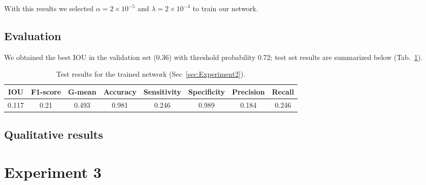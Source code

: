 With this results we selected $\alpha = 2 \times 10^{-5}$ and $\lambda = 2 \times 10^{-3}$ to train our network.

\subsection{Evaluation}
We obtained the best IOU in the validation set (0.36) with threshold probability 0.72; test set results are summarized below (Tab.~\ref{tab:Results2}).
\begin{table}[h]
	\centering
	\begin{tabular}{cccccccc}
	\hline
	\textbf{IOU}	& \textbf{F1-score}	& \textbf{G-mean} &\textbf{Accuracy}	& \textbf{Sensitivity} & \textbf{Specificity} & \textbf{Precision} & \textbf{Recall}\\
	\hline
	 0.117 & 0.21 & 0.493 & 0.981 & 0.246 & 0.989 & 0.184 & 0.246\\
	\hline
	\end{tabular}
	\caption[Results for Experiment 2]{Test results for the trained network (Sec~\ref{sec:Experiment2}).}
	\label{tab:Results2}
\end{table}

\subsection{Qualitative results}



\section{Experiment 3}
